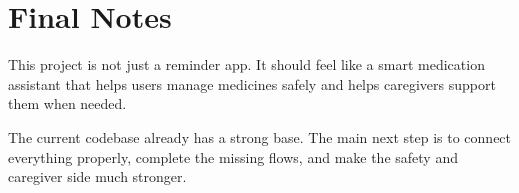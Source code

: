 \documentclass[11pt,a4paper]{article}
\begin{document}
\section{Final Notes}
This project is not just a reminder app. It should feel like a smart medication assistant that helps users manage medicines safely and helps caregivers support them when needed.

The current codebase already has a strong base. The main next step is to connect everything properly, complete the missing flows, and make the safety and caregiver side much stronger.
\end{document}
